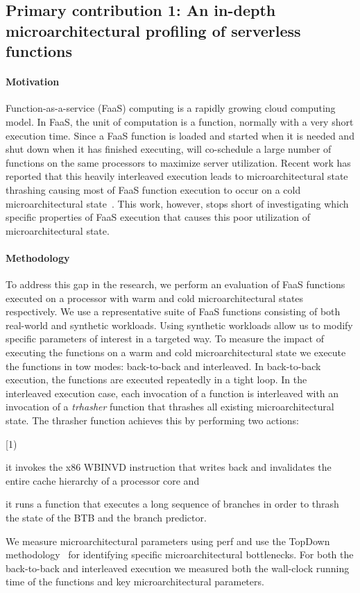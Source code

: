 \documentclass[../main.tex]{subfiles}
\begin{document}
\begin{refsection}
\subsection{Primary contribution 1: An in-depth microarchitectural profiling of serverless functions}


\paragraph{Motivation} Function-as-a-service (FaaS) computing is a rapidly growing cloud computing model. In FaaS, the unit of computation is a function, normally with a very short execution time. Since a FaaS function is loaded and started when it is needed and shut down when it has finished executing, will co-schedule a large number of functions on the same processors to maximize server utilization. Recent work has reported that this heavily interleaved execution leads to microarchitectural state thrashing causing most of FaaS function execution to occur on a cold microarchitectural state~\cite{shahrad19_archit_implic_funct_servic_comput,lukewarm_serverless}. This work, however, stops short of investigating which specific properties of FaaS execution that causes this poor utilization of microarchitectural state.

\paragraph{Methodology}
To address this gap in the research, we perform an evaluation of FaaS functions executed on a processor with warm and cold microarchitectural states respectively. We use a representative suite of FaaS functions consisting of both real-world and synthetic workloads. Using synthetic workloads allow us to modify specific parameters of interest in a targeted way. To measure the impact of executing the functions on a warm and cold microarchitectural state we execute the functions in tow modes: back-to-back and interleaved. In back-to-back execution, the functions are executed repeatedly in a tight loop. In the interleaved execution case, each invocation of a function is interleaved with an invocation of a \emph{trhasher} function that thrashes all existing microarchitectural state. The thrasher function achieves this by performing two actions: \begin{inparaenum}[1) \item it invokes the x86 WBINVD instruction that writes back and invalidates the entire cache hierarchy of a processor core and \item it runs a function that executes a long sequence of branches in order to thrash the state of the BTB and the branch predictor.\end{inparaenum} We measure microarchitectural parameters using perf and use the TopDown methodology~\cite{yasin14_top_down} for identifying specific microarchitectural bottlenecks. For both the back-to-back and interleaved execution we measured both the wall-clock running time of the functions and key microarchitectural parameters.


\end{refsection}
\end{document}
